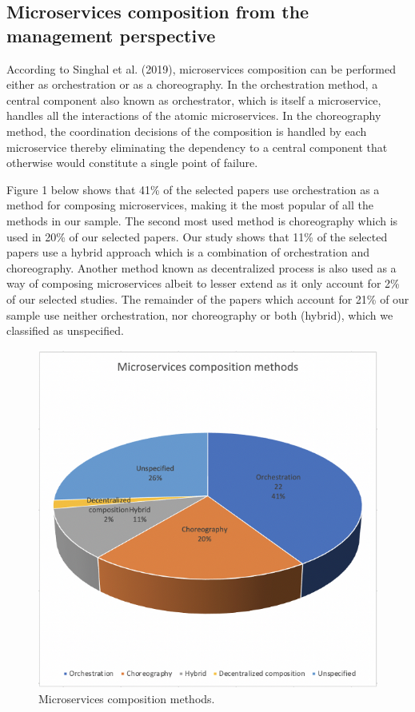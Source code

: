 \documentclass{article}
\begin{document}
\begin{multicols}{2}
\subsection{Microservices composition from the management perspective}


 According to Singhal et al. (2019), microservices composition can be performed either as orchestration or as a choreography. In the orchestration method, a central component also known as orchestrator, which is itself a microservice, handles all the interactions of the atomic microservices. In the choreography method, the coordination decisions of the composition is handled by each microservice thereby eliminating the dependency to a central component that otherwise would constitute a single point of failure. 
 
Figure 1 below shows that 41\% of the selected papers use orchestration as a method for composing microservices, making it the most popular of all the methods in our sample. The second most used method is choreography which is used in 20\% of our selected papers. Our study shows that 11\% of the selected papers use a hybrid approach which is a combination of orchestration and choreography. Another method known as decentralized process is also used as a way of composing microservices albeit to lesser extend as it only account for 2\% of our selected studies. The remainder of the papers which account for 21\% of our sample use neither orchestration, nor choreography or both (hybrid), which we classified as unspecified.

\begin{figure}[htbp]
 \centerline{\includegraphics[scale=0.60]{mscompcore.png}}
  \caption{Microservices composition methods.}
  \label{fig}
\end{figure}



\end{multicols}
\end{document}
